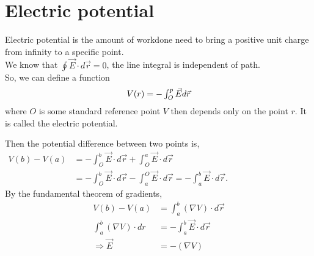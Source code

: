 \section{Electric potential}
\begin{definition}
	Electric potential is the amount of workdone need to bring a positive unit charge from infinity to a specific point.\\
We know that $\oint \vec{E} \cdot d \vec{r}=0$, the line integral is independent of path.
	\\So, we can define a function\begin{equation}
	$$V(r)=-\int_{O}^{p} \vec{E} d \vec{r}$$
	\end{equation} 
	where $O$ is some standard reference point $V$ then depends only on the point $r .$ It is called the
	electric potential.
\end{definition}
Then the potential difference between two points is,\\
$\begin{aligned} V({b})-V({a}) &=-\int_{{O}}^{{b}} \vec{E} \cdot d \vec{r}+\int_{{O}}^{{a}} \vec{E} \cdot d \vec{r} \\ &=-\int_{{O}}^{{b}} \vec{E} \cdot d \vec{r}-\int_{{a}}^{{O}} \vec{E} \cdot d \vec{r}=-\int_{{a}}^{{b}} \vec{E} \cdot d \vec{r} . \end{aligned}$\\
By the fundamental theorem of gradients,
\begin{align*}
V({b})-V({a})&=\int_{a}^{b}(\nabla V) \cdot d \vec{r} \\
\int_{{a}}^{{b}}(\nabla V) \cdot d {r}&=-\int_{{a}}^{{b}} \vec{E} \cdot d \vec{r}\\
\Longrightarrow \vec{E}&=-(\nabla V)
\end{align*}
\begin{center}
\end{center}
